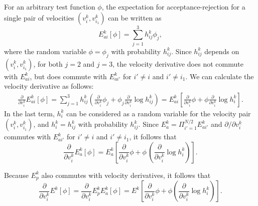 \documentclass[12pt,nopreprintline]{elsarticle}
\begin{document}
For an arbitrary test function $\phi$, the expectation for acceptance-rejection for a single pair of velocities $(v_i^k, v_{i_1}^k)$  can be written  as
\begin{equation*}%
E_{ai}^k [ \phi ] 
= \sum_{j=1}^3 h_{ij}^k \phi_j,
\end{equation*}
where the random variable $\phi = \phi_j$ with probability $h_{ij}^k$. Since $h_{ij}^k$ depends on $(v_i^{k}, v_{i_1}^{k})$, for both $j=2$ and $j=3$, the velocity derivative does not commute with $E_{ai}^k$, but does commute with $E_{ai'}^k$  for $i'\neq i$ and $i'\neq i_1$.
We can calculate the velocity derivative as follows:
\begin{eqnarray*} 
  \frac{\partial}{\partial v_i^k}  E_{ai}^k [ \phi  ] 
= \sum_{j=1}^3  h_{ij}^k \left(  \frac{\partial}{\partial v_i^k}  \phi_j + \phi_j  \frac{\partial}{\partial v_i^k} \log h_{ij}^k \right) 
= E_{ai}^k \left[   \frac{\partial}{\partial v_i^k}  \phi  + \phi  \frac{\partial}{\partial v_i^k} \log h_{i}^k \right].
\end{eqnarray*}
In the last term, $h_i^k$ can be considered as a random variable for the velocity pair $(v_i^{k}, v_{i_1}^{k})$, and $h_i^k = h_{ij}^k$ with probability $h_{ij}^k$. Since $E^k_a= \Pi_{i'=1}^{N/2} E^k_{ai'}$ and ${\partial}/{\partial v_i^k}$ commutes with $E^k_{ai'}$ for $i'\neq i$ and $i'\neq i_1$, it follows that 
\begin{equation*}%
\frac{\partial}{\partial v_i^k}  E_{a}^k [ \phi  ] 
= E_{a}^k \left[ \frac{\partial}{\partial v_i^k}  \phi + \phi\, \left(\frac{\partial}{\partial v_i^k} \log h_i^k \right)   \right]  .
\end{equation*}

Because $E_p^k$ also commutes with velocity derivatives, 
it follows that
\begin{equation}\label{eq:phi_diff_final}
    \frac{\partial}{\partial v_i^k}  E^k [ \phi  ]   =  \frac{\partial}{\partial v_i^k}  E_{p}^k E_{a}^k [ \phi  ]  = 
    E^k \left[ \frac{\partial}{\partial v_i^k}  \phi + \phi \left(\frac{\partial}{\partial v_i^k} \log h_i^k \right) \right].
\end{equation}
\end{document}
